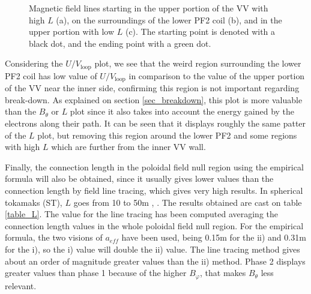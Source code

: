 \documentclass[a4paper,12pt,oneside]{book}
\begin{document}
\begin{figure}[t]
\centering
{}
\hfill
{}


\caption{Magnetic field lines starting in the upper portion of the VV with high $L$ (a), on the surroundings of the lower PF2 coil (b), and in the upper portion with low $L$ (c). The starting point is denoted with a black dot, and the ending point with a green dot.}
\label{fig_lines_int}
\end{figure}

Considering the $U/V_\text{loop}$ plot, we see that the weird region surrounding the lower PF2 coil has low value of $U/V_\text{loop}$ in comparison to the value of the upper portion of the VV near the inner side, confirming this region is not important regarding break-down. As explained on section \ref{sec_breakdown}, this plot is more valuable than the $B_\theta$ or $L$ plot since it also takes into account the energy gained by the electrons along their path. It can be seen that it displays roughly the same patter of the $L$ plot, but removing this region around the lower PF2 and some regions with high $L$ which are further from the inner VV wall.

Finally, the connection length in the poloidal field null region using the empirical formula will also be obtained, since it usually gives lower values than the connection length by field line tracing, which gives very high results. In spherical tokamaks (ST), $L$ goes from 10 to 50m \cite{VEST_2015}, \cite{Globus_2001}. The results obtained are cast on table \ref{table_L}. The value for the line tracing has been computed averaging the connection length values in the whole poloidal field null region. For the empirical formula, the two visions of $a_{eff}$ have been used, being 0.15m for the ii) and 0.31m for the i), so the i) value will double the ii) value. The line tracing method gives about an order of magnitude greater values than the ii) method. Phase 2 displays greater values than phase 1 because of the higher $B_\varphi$, that makes $B_\theta$ less relevant.
\end{document}
